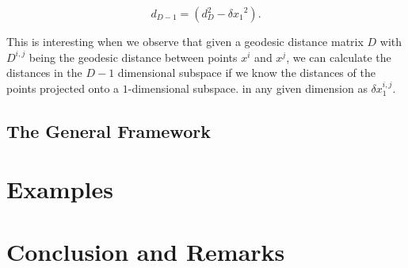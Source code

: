 \documentclass[11pt]{article}
\begin{document}
\[d_{D-1} = (d_{D}^2 - {\delta x_1}^2).\]

This is interesting when we observe that given a geodesic distance matrix $D$ with $D^{i,j}$ being the geodesic distance between points $x^i$ and $x^j$, we can calculate the distances in the $D-1$ dimensional subspace if we know the distances of the points projected onto a $1$-dimensional subspace. in any given dimension as ${\delta x}_1^{i,j}$.

\subsection{The General Framework}



\section{Examples}

\section{Conclusion and Remarks}
\end{document}
